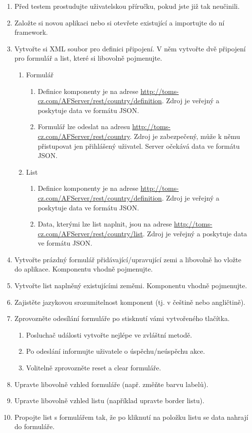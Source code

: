 \begin{enumerate}
\item Před testem prostudujte uživatelskou příručku, pokud jste již tak neučinili.
\item Založte si novou aplikaci nebo si otevřete existující a importujte do ní framework.
\item Vytvořte si XML soubor pro definici připojení. V něm vytvořte dvě připojení pro formulář a list, které si libovolně pojmenujte. 
\begin{enumerate}
\item Formulář
\begin{enumerate}
\item Definice komponenty je na adrese \url{http://toms-cz.com/AFServer/rest/country/definition}. Zdroj je veřejný a poskytuje data ve formátu JSON.
\item Formulář lze odeslat na adresu \url{http://toms-cz.com/AFServer/rest/country}. Zdroj je zabezpečený, může k němu přistupovat jen přihlášený uživatel. Server očekává data ve formátu JSON.
\end{enumerate}
\item List
\begin{enumerate}
\item Definice komponenty je na adrese \url{http://toms-cz.com/AFServer/rest/country/definition}. Zdroj je veřejný a poskytuje data ve formátu JSON.
\item Data, kterými lze list naplnit, jsou na adrese \url{http://toms-cz.com/AFServer/rest/country/list}. Zdroj je veřejný a poskytuje data ve formátu JSON.
\end{enumerate}
\end{enumerate}
\item Vytvořte prázdný formulář přidávající/upravující zemi a libovolně ho vložte do aplikace. Komponentu vhodně pojmenujte.
\item Vytvořte list naplněný existujícími zeměmi. Komponentu vhodně pojmenujte.
\item Zajistěte jazykovou srozumitelnost komponent (tj. v češtině nebo angličtině).
\item Zprovozněte odesílání formuláře po stisknutí vámi vytvořeného tlačítka.
\begin{enumerate}
\item Posluchač události vytvořte nejlépe ve zvláštní metodě.
\item Po odeslání informujte uživatele o úspěchu/neúspěchu akce.
\item Volitelně zprovozněte reset a clear formuláře.
\end{enumerate}
\item Upravte libovolně vzhled formuláře (např. změňte barvu labelů).
\item Upravte libovolně vzhled listu (například upravte border listu).
\item Propojte list s formulářem tak, že po kliknutí na položku listu se data nahrají do formuláře.
\end{enumerate}

